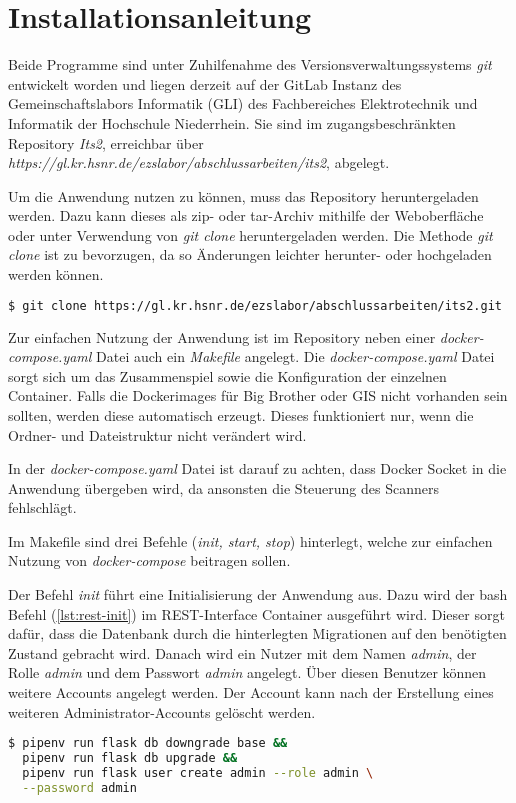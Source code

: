 \section{Installationsanleitung}
Beide Programme sind unter Zuhilfenahme des Versionsverwaltungssystems \textit{git} entwickelt worden und liegen derzeit auf der GitLab Instanz des Gemeinschaftslabors Informatik (GLI) des Fachbereiches Elektrotechnik und Informatik der Hochschule Niederrhein. Sie sind im zugangsbeschränkten Repository \textit{Its2}, erreichbar über\\ \textit{https://gl.kr.hsnr.de/ezslabor/abschlussarbeiten/its2}, abgelegt.

Um die Anwendung nutzen zu können, muss das Repository heruntergeladen werden.
Dazu kann dieses als zip- oder tar-Archiv mithilfe der Weboberfläche oder unter Verwendung von \textit{git clone} heruntergeladen werden. Die Methode \textit{git clone} ist zu bevorzugen, da so Änderungen leichter herunter- oder hochgeladen werden können.

\begin{lstlisting}[language=bash, caption={git clone (bash)}, captionpos=b, label={lst:git-clone}]
$ git clone https://gl.kr.hsnr.de/ezslabor/abschlussarbeiten/its2.git
\end{lstlisting}

Zur einfachen Nutzung der Anwendung ist im Repository neben einer \textit{docker-compose.yaml} Datei auch ein \textit{Makefile} angelegt. Die \textit{docker-compose.yaml} Datei sorgt sich um das Zusammenspiel sowie die Konfiguration der einzelnen Container. Falls die Dockerimages für Big Brother oder GIS nicht vorhanden sein sollten, werden diese automatisch erzeugt. Dieses funktioniert nur, wenn die Ordner- und Dateistruktur nicht verändert wird.

In der \textit{docker-compose.yaml} Datei ist darauf zu achten, dass Docker Socket in die Anwendung übergeben wird, da ansonsten die Steuerung des Scanners fehlschlägt.

Im Makefile sind drei Befehle (\textit{init, start, stop}) hinterlegt, welche zur einfachen Nutzung von \textit{docker-compose} beitragen sollen.

Der Befehl \textit{init} führt eine Initialisierung der Anwendung aus. Dazu wird der bash Befehl (\ref{lst:rest-init}) im REST-Interface Container ausgeführt wird.
Dieser sorgt dafür, dass die Datenbank durch die hinterlegten Migrationen auf den benötigten Zustand gebracht wird. Danach wird ein Nutzer mit dem Namen \textit{admin}, der Rolle \textit{admin} und dem Passwort \textit{admin} angelegt. Über diesen Benutzer können weitere Accounts angelegt werden. Der Account kann nach der Erstellung eines weiteren Administrator-Accounts gelöscht werden.
\begin{lstlisting}[language=bash, caption={Initalisierung REST-Interface (bash)}, captionpos=b, label={lst:rest-init}]
$ pipenv run flask db downgrade base && 
  pipenv run flask db upgrade && 
  pipenv run flask user create admin --role admin \
  --password admin
\end{lstlisting}

